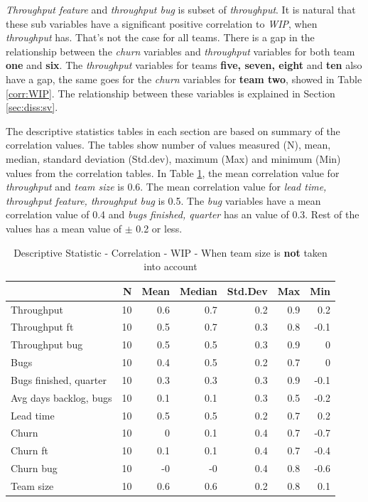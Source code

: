 \documentclass[UKenglish]{ifimaster}  %
\begin{document}
\textit{Throughput feature} and \textit{throughput bug} is subset of \textit{throughput}. It is natural that these sub variables have a significant positive correlation to \textit{WIP}, when \textit{throughput} has. That's not the case for all teams. 
There is a gap in the relationship between the \textit{churn} variables and \textit{throughput} variables for both team \textbf{one} and \textbf{six}. The \textit{throughput} variables for teams \textbf{five, seven, eight} and \textbf{ten} also have a gap, the same goes for the \textit{churn} variables for \textbf{team two},  showed in Table \ref{corr:WIP}.  The relationship between these variables is explained in Section \ref{sec:diss:sv}.


The descriptive statistics tables in each section are based on summary of the correlation values. The tables show number of values measured (N), mean, median, standard deviation (Std.dev), maximum (Max)  and minimum (Min) values from the correlation tables.
In Table \ref{DS:corr:WIP}, the mean correlation value for \textit{throughput} and \textit{team size} is 0.6. The mean correlation value for \textit{lead time, throughput feature, throughput bug} is 0.5. The \textit{bug} variables have a mean correlation value of 0.4 and \textit{bugs finished, quarter} has an value of 0.3. Rest of the values has a mean value of $\pm$ 0.2 or less.
\begin{minipage}[t]{\linewidth}
\begin{table}[H]
 \centering
 \begin{tabular}{ | l | r | r | r | r | r | r | }
 \hline
& \bf{N} & \bf{Mean} & \bf{Median} & \bf{Std.Dev} & \bf{Max} & \bf{Min} \\ \hline
Throughput  & 10 & 0.6 & 0.7 & 0.2 & 0.9 & 0.2\\ \hline
Throughput ft  & 10 & 0.5 & 0.7 & 0.3 & 0.8 & -0.1\\ \hline
Throughput bug  & 10 & 0.5 & 0.5 & 0.3 & 0.9 & 0\\ \hline
Bugs  & 10 & 0.4 & 0.5 & 0.2 & 0.7 & 0\\ \hline
Bugs finished, quarter  & 10 & 0.3 & 0.3 & 0.3 & 0.9 & -0.1\\ \hline
Avg days backlog, bugs  & 10 & 0.1 & 0.1 & 0.3 & 0.5 & -0.2\\ \hline
Lead time & 10 & 0.5 & 0.5 & 0.2 & 0.7 & 0.2\\ \hline
Churn  & 10 & 0 & 0.1 & 0.4 & 0.7 & -0.7\\ \hline
Churn ft  & 10 & 0.1 & 0.1 & 0.4 & 0.7 & -0.4\\ \hline
Churn bug  & 10 & -0 & -0 & 0.4 & 0.8 & -0.6\\ \hline
Team size  & 10 & 0.6 & 0.6 & 0.2 & 0.8 & 0.1\\ \hline
\end{tabular}
 \caption{Descriptive Statistic - Correlation - WIP - When team size is \textbf{not} taken into account}
 \label{DS:corr:WIP}
 \end{table}
\end{minipage} 
\end{document}

